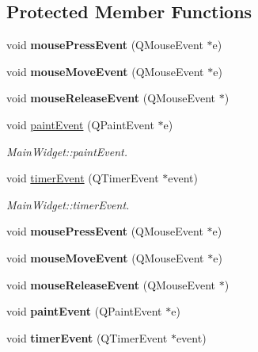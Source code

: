 \subsection*{Protected Member Functions}
\begin{DoxyCompactItemize}
\item 
\mbox{\label{class_q_qt_custom_qr_decode_widget_aed273bf533287a41b2a91e86d81358c1}} 
void {\bfseries mouse\+Press\+Event} (Q\+Mouse\+Event $\ast$e)
\item 
\mbox{\label{class_q_qt_custom_qr_decode_widget_a8c0001e7e9df89da456308ccf09eceee}} 
void {\bfseries mouse\+Move\+Event} (Q\+Mouse\+Event $\ast$e)
\item 
\mbox{\label{class_q_qt_custom_qr_decode_widget_ad3cb1129e1ce790d348b48bfe94fc04e}} 
void {\bfseries mouse\+Release\+Event} (Q\+Mouse\+Event $\ast$)
\item 
void \mbox{\hyperlink{class_q_qt_custom_qr_decode_widget_a46150f7cceb96af7b686202ee0706f98}{paint\+Event}} (Q\+Paint\+Event $\ast$e)
\begin{DoxyCompactList}\small\item\em Main\+Widget\+::paint\+Event. \end{DoxyCompactList}\item 
void \mbox{\hyperlink{class_q_qt_custom_qr_decode_widget_a8190eb6ea34bc5c8ed15a83a0f16c5dc}{timer\+Event}} (Q\+Timer\+Event $\ast$event)
\begin{DoxyCompactList}\small\item\em Main\+Widget\+::timer\+Event. \end{DoxyCompactList}\item 
\mbox{\label{class_q_qt_custom_qr_decode_widget_aed273bf533287a41b2a91e86d81358c1}} 
void {\bfseries mouse\+Press\+Event} (Q\+Mouse\+Event $\ast$e)
\item 
\mbox{\label{class_q_qt_custom_qr_decode_widget_a8c0001e7e9df89da456308ccf09eceee}} 
void {\bfseries mouse\+Move\+Event} (Q\+Mouse\+Event $\ast$e)
\item 
\mbox{\label{class_q_qt_custom_qr_decode_widget_ad3cb1129e1ce790d348b48bfe94fc04e}} 
void {\bfseries mouse\+Release\+Event} (Q\+Mouse\+Event $\ast$)
\item 
\mbox{\label{class_q_qt_custom_qr_decode_widget_a46150f7cceb96af7b686202ee0706f98}} 
void {\bfseries paint\+Event} (Q\+Paint\+Event $\ast$e)
\item 
\mbox{\label{class_q_qt_custom_qr_decode_widget_a8190eb6ea34bc5c8ed15a83a0f16c5dc}} 
void {\bfseries timer\+Event} (Q\+Timer\+Event $\ast$event)
\end{DoxyCompactItemize}
